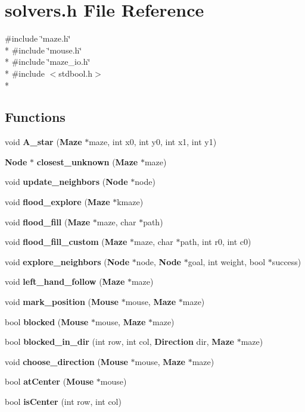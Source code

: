 \section{solvers.\-h File Reference}
\label{solvers_8h}
{\ttfamily \#include \char`\"{}maze.\-h\char`\"{}}\\*
{\ttfamily \#include \char`\"{}mouse.\-h\char`\"{}}\\*
{\ttfamily \#include \char`\"{}maze\-\_\-io.\-h\char`\"{}}\\*
{\ttfamily \#include $<$stdbool.\-h$>$}\\*
\subsection*{Functions}
\begin{DoxyCompactItemize}
\item 
void {\bf A\-\_\-star} ({\bf Maze} $\ast$maze, int x0, int y0, int x1, int y1)
\item 
{\bf Node} $\ast$ {\bf closest\-\_\-unknown} ({\bf Maze} $\ast$maze)
\item 
void {\bf update\-\_\-neighbors} ({\bf Node} $\ast$node)
\item 
void {\bf flood\-\_\-explore} ({\bf Maze} $\ast$kmaze)
\item 
void {\bf flood\-\_\-fill} ({\bf Maze} $\ast$maze, char $\ast$path)
\item 
void {\bf flood\-\_\-fill\-\_\-custom} ({\bf Maze} $\ast$maze, char $\ast$path, int r0, int c0)
\item 
void {\bf explore\-\_\-neighbors} ({\bf Node} $\ast$node, {\bf Node} $\ast$goal, int weight, bool $\ast$success)
\item 
void {\bf left\-\_\-hand\-\_\-follow} ({\bf Maze} $\ast$maze)
\item 
void {\bf mark\-\_\-position} ({\bf Mouse} $\ast$mouse, {\bf Maze} $\ast$maze)
\item 
bool {\bf blocked} ({\bf Mouse} $\ast$mouse, {\bf Maze} $\ast$maze)
\item 
bool {\bf blocked\-\_\-in\-\_\-dir} (int row, int col, {\bf Direction} dir, {\bf Maze} $\ast$maze)
\item 
void {\bf choose\-\_\-direction} ({\bf Mouse} $\ast$mouse, {\bf Maze} $\ast$maze)
\item 
bool {\bf at\-Center} ({\bf Mouse} $\ast$mouse)
\item 
bool {\bf is\-Center} (int row, int col)
\end{DoxyCompactItemize}


